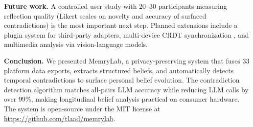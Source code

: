 \documentclass[pdflatex,sn-mathphys-num]{sn-jnl}
\begin{document}
\textbf{Future work.} A controlled user study with 20--30 participants measuring reflection quality (Likert scales on novelty and accuracy of surfaced contradictions) is the most important next step. Planned extensions include a plugin system for third-party adapters, multi-device CRDT synchronization \cite{shapiro2011crdt}, and multimedia analysis via vision-language models.

\textbf{Conclusion.} We presented MemryLab, a privacy-preserving system that fuses 33 platform data exports, extracts structured beliefs, and automatically detects temporal contradictions to surface personal belief evolution. The contradiction detection algorithm matches all-pairs LLM accuracy while reducing LLM calls by over 99\%, making longitudinal belief analysis practical on consumer hardware. The system is open-source under the MIT license at \url{https://github.com/tlaad/memrylab}.


\end{document}
